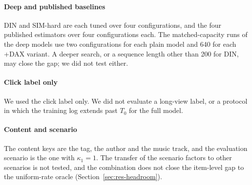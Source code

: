 \paragraph{Deep and published baselines} DIN and SIM-hard are each tuned over four configurations, and the four published estimators over four
configurations each. The matched-capacity runs of the deep models use two configurations for each plain model and 640 for each +DAX variant. A
deeper search, or a sequence length other than 200 for DIN, may close the gap; we did not test either.

\paragraph{Click label only} We used the click label only. We did not evaluate a long-view label, or a protocol in which the training log extends
past $T_0$ for the full model.

\paragraph{Content and scenario} The content keys are the tag, the author and the music track, and the evaluation scenario is the one with
$\kappa_1=1$. The transfer of the scenario factors to other scenarios is not tested, and the combination does not close the item-level gap to the
uniform-rate oracle (Section~\ref{sec:res-headroom}).
